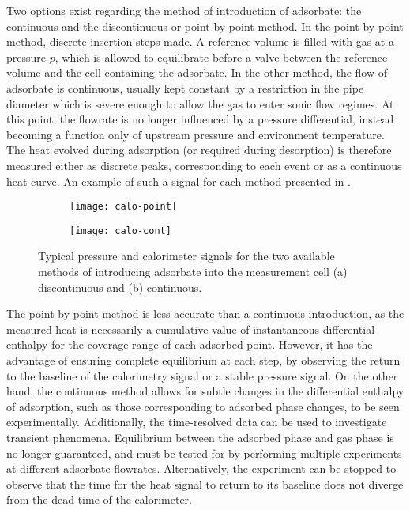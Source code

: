 Two options exist regarding the method of introduction of adsorbate:
the continuous and the discontinuous or point-by-point method. In
the point-by-point method, discrete insertion steps made. 
A reference volume is filled with gas at a pressure \(p\), which
is allowed to equilibrate before a valve between the reference volume 
and the cell containing the adsorbate. 
In the other method, the flow of adsorbate is continuous, usually kept 
constant by a restriction in the pipe diameter which is severe enough
to allow the gas to enter sonic flow regimes. At this point, the 
flowrate is no longer influenced by a pressure differential, 
instead becoming a function only of upstream pressure and environment 
temperature.
The heat evolved during adsorption (or required during desorption)
is therefore measured either as discrete peaks, corresponding to 
each event or as a continuous heat curve. An example of such a signal 
for each method presented in .

\begin{figure}[htb]

  \centering
  \begin{subfigure}[b]{.5\textwidth}
      \centering
      \texttt{[image: calo-point]}
      \caption{}%
      \label{calo:fig:calo-point}
  \end{subfigure}
  \begin{subfigure}[b]{.48\textwidth}
    \centering
    \texttt{[image: calo-cont]}
    \caption{}%
    \label{calo:fig:calo-cont}
\end{subfigure}%
  \caption{Typical pressure and calorimeter signals for the two
  available methods of introducing adsorbate into the measurement
  cell (a) discontinuous and (b) continuous.
  }%
  \label{calo:fig:calo-measure}

\end{figure}

The point-by-point method is less accurate than a continuous introduction,
as the measured heat is necessarily a cumulative value of instantaneous
differential enthalpy for the coverage range of each adsorbed point.
However, it has the advantage of ensuring complete equilibrium at 
each step, by observing the return to the baseline of the calorimetry
signal or a stable pressure signal. On the other hand, the 
continuous method allows for subtle changes in the differential enthalpy of 
adsorption, such as those corresponding to adsorbed phase changes, 
to be seen experimentally. Additionally, the time-resolved data
can be used to investigate transient phenomena. Equilibrium between 
the adsorbed phase and gas phase is no longer guaranteed, and must be
tested for by performing multiple experiments at different adsorbate
flowrates. Alternatively, the experiment can be stopped to observe that the 
time for the heat signal to return to its baseline does not diverge 
from the dead time of the calorimeter.
